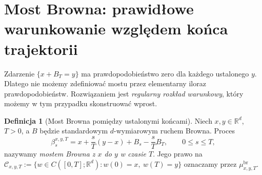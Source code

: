 \documentclass[11pt,a4paper,oneside]{report}
\numberwithin{equation}{chapter}
\theoremstyle{plain}
\theoremstyle{definition}
\newtheorem{definicja}{Definicja}[chapter]
\theoremstyle{remark}
\newcommand{\R}{\mathbb{R}}
\newcommand{\calC}{\mathcal{C}}
\begin{document}
\section{Most Browna: prawidłowe warunkowanie względem końca trajektorii}\label{sec:volIII:15:02}

Zdarzenie $\{x+B_T=y\}$ ma prawdopodobieństwo zero dla
każdego ustalonego $y$. Dlatego nie możemy zdefiniować mostu
przez elementarny iloraz prawdopodobieństw.
Rozwiązaniem jest \emph{regularny rozkład warunkowy}, który
możemy w tym przypadku skonstruować wprost.

\begin{definicja}[Most Browna pomiędzy ustalonymi końcami]\label{def:volIII:15:02}
\label{def:brownian-bridge-path}
Niech $x,y\in\R^d$, $T>0$, a $B$ będzie standardowym
$d$-wymiarowym ruchem Browna. Proces
\[
 \beta_s^{x,y,T}=x+\frac{s}{T}(y-x)+B_s-\frac{s}{T}B_T,
 \qquad 0\le s\le T,
\]
nazywamy \emph{mostem Browna z $x$ do $y$ w czasie $T$}.
Jego prawo na
$\calC_{x,y,T}:=\{w\in C([0,T];\R^d):w(0)=x,\ w(T)=y\}$
oznaczamy przez $\mu_{x,y,T}^{\mathrm{br}}$.
\end{definicja}
\end{document}
